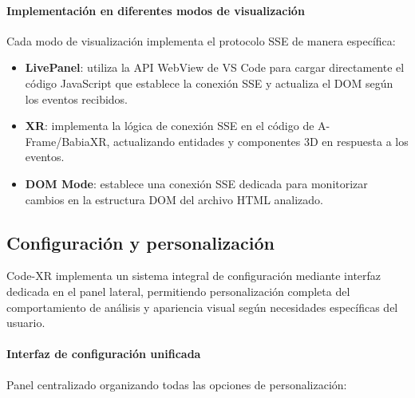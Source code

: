\documentclass[a4paper, 12pt]{book}
\begin{document}
\paragraph{Implementación en diferentes modos de visualización}
Cada modo de visualización implementa el protocolo SSE de manera específica:

\begin{itemize}
  \item \textbf{LivePanel}: utiliza la API WebView de VS Code para cargar directamente el código JavaScript que establece la conexión SSE y actualiza el DOM según los eventos recibidos.
  
  \item \textbf{XR}: implementa la lógica de conexión SSE en el código de A-Frame/BabiaXR, actualizando entidades y componentes 3D en respuesta a los eventos.
  
  \item \textbf{DOM Mode}: establece una conexión SSE dedicada para monitorizar cambios en la estructura DOM del archivo HTML analizado.
\end{itemize}

\subsection{Configuración y personalización}
\label{sec:configuracion}

Code-XR implementa un sistema integral de configuración mediante interfaz dedicada en el panel lateral, permitiendo personalización completa del comportamiento de análisis y apariencia visual según necesidades específicas del usuario.

\paragraph{Interfaz de configuración unificada}
Panel centralizado organizando todas las opciones de personalización:
\end{document}
